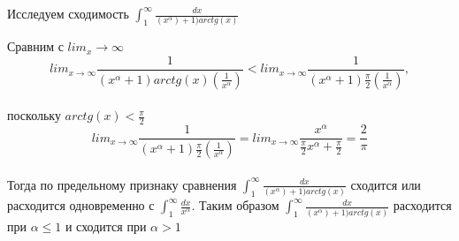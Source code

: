 \begin{center}
    Исследуем сходимость \( \int_{1}^{\infty} \frac{dx}{(x^\alpha) + 1)arctg(x)} \)
    
    Сравним с \(lim_x \to \infty\)
    \[lim_{x \to \infty} \frac{1}{(x^\alpha + 1)arctg(x)(\frac{1}{x^\alpha})} < lim_{x \to \infty} \frac{1}{(x^\alpha + 1)\frac{\pi}{2}(\frac{1}{x^\alpha})},
    \]\\
    поскольку \(arctg(x) < \frac{\pi}{2}\)
    \[
    lim_{x \to \infty} \frac{1}{(x^\alpha + 1)\frac{\pi}{2}(\frac{1}{x^\alpha})} = lim_{x \to \infty} \frac{x^\alpha}{\frac{\pi}{2}x^\alpha + \frac{\pi}{2}} = \frac{2}{\pi}
    \]\\
    Тогда по предельному признаку сравнения \( \int_{1}^{\infty} \frac{dx}{(x^\alpha) + 1)arctg(x)} \) сходится или расходится одновременно с \(\int_{1}^{\infty} \frac{dx}{x^\alpha}\). Таким образом  \( \int_{1}^{\infty} \frac{dx}{(x^\alpha) + 1)arctg(x)} \) расходится при \(\alpha \leq 1\) и сходится при \(\alpha > 1\)
\end{center}